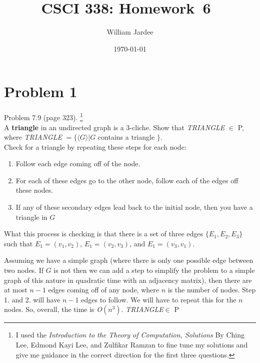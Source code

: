 \documentclass[11pt]{article}
\begin{document}
\graphicspath{{../images/}}

\title{CSCI 338: Homework~6~}
\author{William Jardee}
\date{\today}
\maketitle



\section*{Problem 1}

Problem 7.9 (page 323).
\footnote{I used the \textit{Introduction to the Theory of Computation, Solutions} By Ching Lee, Edmond Kayi Lee, and Zulfikar Ramzan to fine tune my solutions and give me guidance in the correct direction for the first three questions.}\\

\noindent
A {\bf triangle} in an undirected graph is a 3-cliche. Show that {\em TRIANGLE} $\in$ P, where {\em TRIANGLE} $= \{ \langle G \rangle | G$ contains a triangle $\}$.\\

Check for a triangle by repeating these steps for each node:
\begin{enumerate}
    \item Follow each edge coming off of the node.
    \item For each of these edges go to the other node, follow each of the edges off these nodes.
    \item If any of these secondary edges lead back to the initial node, then you have a triangle in $G$
\end{enumerate}

What this process is checking is that there is a set of three edges $\{E_1, E_2, E_3\}$ such that $E_1 = (v_1, v_2)$, $E_1 = (v_2, v_3)$, and $E_1 = (v_3, v_1)$. 

Assuming we have a simple graph (where there is only one possible edge between two nodes. If $G$ is not then we can add a step to simplify the problem to a simple graph of this nature in quadratic time with an adjacency matrix), then there are at most $n-1$ edges coming off of any node, where $n$ is the number of nodes. Step 1. and 2. will have $n-1$ edges to follow. We will have to repeat this for the $n$ nodes. So, overall, the time is {\em O}$(n^3)$. {\em TRIANGLE}$\in$ P

\newpage
\end{document}
